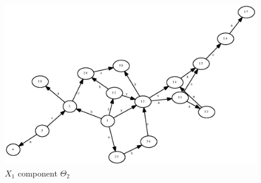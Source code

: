 \documentclass[a4paper,12pt]{article}
\numberwithin{equation}{section}
\numberwithin{figure}{section}
\begin{document}
\begin{figure}
\begin{center}
\includegraphics[scale=0.5, bb=50 200 580 580]{python/ex_K_f2.eps}
\caption{$X_1$ component $\Theta_2$}
\label{fig:K_f2}
\end{center}
\end{figure}
\end{document}
